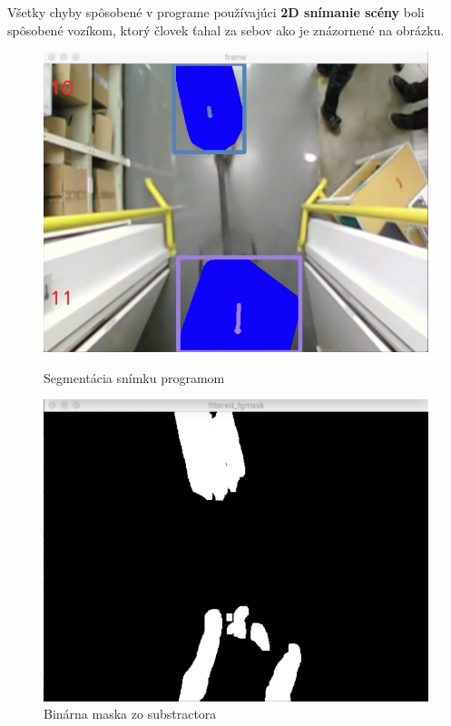 Všetky chyby spôsobené v programe používajúci \textbf{2D snímanie scény} boli spôsobené vozíkom, ktorý človek ťahal za sebov ako je znázornené na obrázku. 

\begin{figure}[H]
  \centering
  \begin{minipage}[b]{0.43\textwidth}
    \includegraphics[width=\textwidth]{images/handCard}
    \caption{Segmentácia snímku programom}
  \end{minipage}
  \hfill
  \begin{minipage}[b]{0.43\textwidth}
    \includegraphics[width=\textwidth]{images/handCard_fmask}
    \caption{Binárna maska zo substractora}
  \end{minipage}
\end{figure}  

